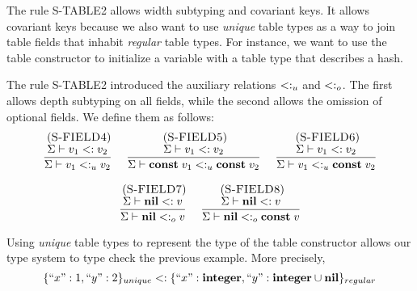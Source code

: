 The rule \textsc{S-TABLE2} allows width subtyping and covariant keys.
It allows covariant keys because we also want to use \emph{unique}
table types as a way to join table fields that inhabit \emph{regular} table types.
For instance, we want to use the table constructor to initialize
a variable with a table type that describes a hash.

The rule \textsc{S-TABLE2} introduced the auxiliary relations
$<:_{u}$ and $<:_{o}$.
The first allows depth subtyping on all fields,
while the second allows the omission of optional fields.
We define them as follows:
\[
\begin{array}{c}
\begin{array}{c}
\; (\textsc{S-FIELD4})\\
\dfrac{\Sigma \vdash v_{1} <: v_{2}}
      {\Sigma \vdash v_{1} <:_{u} v_{2}}
\end{array}
\;
\begin{array}{c}
\; (\textsc{S-FIELD5})\\
\dfrac{\Sigma \vdash v_{1} <: v_{2}}
      {\Sigma \vdash \mathbf{const} \; v_{1} <:_{u} \mathbf{const} \; v_{2}}
\end{array}
\;
\begin{array}{c}
\; (\textsc{S-FIELD6})\\
\dfrac{\Sigma \vdash v_{1} <: v_{2}}
      {\Sigma \vdash v_{1} <:_{u} \mathbf{const} \; v_{2}}
\end{array}
\\ \\
\begin{array}{c}
\; (\textsc{S-FIELD7})\\
\dfrac{\Sigma \vdash \mathbf{nil} <: v}
      {\Sigma \vdash \mathbf{nil} <:_{o} v}
\end{array}
\;
\begin{array}{c}
\; (\textsc{S-FIELD8})\\
\dfrac{\Sigma \vdash \mathbf{nil} <: v}
      {\Sigma \vdash \mathbf{nil} <:_{o} \mathbf{const} \; v}
\end{array}
\end{array}
\]

Using \emph{unique} table types to represent the type of the table
constructor allows our type system to type check the previous example.
More precisely,
\[
\{``x":1, ``y":2\}_{unique} <: \{``x":\mathbf{integer}, ``y":\mathbf{integer} \cup \mathbf{nil}\}_{regular}
\]

